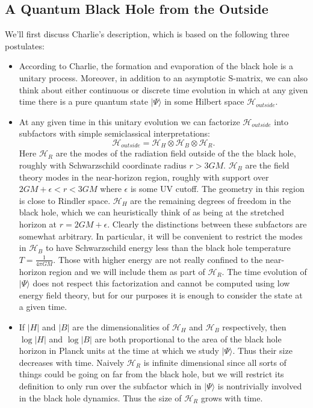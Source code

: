 \documentclass[12pt]{article}
\newcommand{\be}{\begin{equation}}
\newcommand{\ee}{\end{equation}}
\newcommand{\HH}{\mathcal{H}_H}
\newcommand{\HB}{\mathcal{H}_B}
\newcommand{\HR}{\mathcal{H}_R}
\newcommand{\ran}{\rangle}
\begin{document}
\subsection{A Quantum Black Hole from the Outside}
We'll first discuss Charlie's description, which is based on the following three postulates:
\begin{itemize}
\item According to Charlie, the formation and evaporation of the black hole is a unitary process.  Moreover, in addition to an asymptotic S-matrix, we can also think about either continuous or discrete time evolution in which at any given time there is a pure quantum state $|\Psi\ran$ in some Hilbert space $\mathcal{H}_{outside}$.
\item At any given time in this unitary evolution we can factorize $\mathcal{H}_{outside}$ into subfactors with simple semiclassical interpretations:
\be\label{outfactor}
\mathcal{H}_{outside}=\HH \otimes \HB \otimes \HR.
\ee
Here $\HR$ are the modes of the radiation field outside of the the black hole, roughly with Schwarzschild coordinate radius $r>3GM$.  $\HB$ are the field theory modes in the near-horizon region, roughly with support over $2GM+\epsilon<r<3GM$ where $\epsilon$ is some UV cutoff.  The geometry in this region is close to Rindler space.  $\HH$ are the remaining degrees of freedom in the black hole, which we can heuristically think of as being at the stretched horizon at $r=2GM+\epsilon$.  Clearly the distinctions between these subfactors are somewhat arbitrary. In particular, it will be convenient to restrict the modes in $\HB$ to have Schwarzschild energy less than the black hole temperature $T=\frac{1}{4\pi G M}$.  Those with higher energy are not really confined to the near-horizon region and we will include them as part of $\HR$. The time evolution of $|\Psi\ran$ does not respect this factorization and cannot be computed using low energy field theory, but for our purposes it is enough to consider the state at a given time.
\item If $|H|$ and $|B|$ are the dimensionalities of $\HH$ and $\HB$ respectively, then $\log|H|$ and $\log|B|$ are both proportional to the area of the black hole horizon in Planck units at the time at which we study $|\Psi\ran$.  Thus their size decreases with time.  Naively $\HR$ is infinite dimensional since all sorts of things could be going on far from the black hole, but we will restrict its definition to only run over the subfactor which in $|\Psi\ran$ is nontrivially involved in the black hole dynamics.  Thus the size of $\HR$ grows with time.
\end{itemize}
\end{document}
